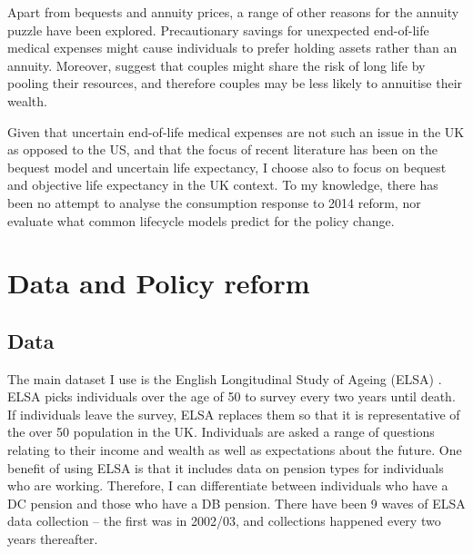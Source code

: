 \documentclass[12pt]{article}
\begin{document}
Apart from bequests and annuity prices, a range of other reasons for the annuity
puzzle have been explored. Precautionary savings for unexpected end-of-life
medical expenses might cause individuals to prefer holding assets rather than
an annuity. Moreover, \cite{vidalmelia_lejarragagarcia_munich_2004} suggest
that couples might share the risk of long life by pooling their resources, and
therefore couples may be less likely to annuitise their wealth.

Given that uncertain end-of-life medical expenses are not such an issue in the
UK as opposed to the US, and that the focus of recent literature has been on the
bequest model and uncertain life expectancy, I choose also to focus on bequest
and objective life expectancy in the UK context. To my knowledge, there has been
no attempt to analyse the consumption response to 2014 reform, nor evaluate what
common lifecycle models predict for the policy change.

\section{Data and Policy reform}

\subsection{Data}

The main dataset I use is the English Longitudinal Study of Ageing (ELSA)
\citep{main_elsa_citation}. ELSA picks individuals over the age of 50 to survey
every two years until death. If individuals leave the survey, ELSA replaces them
so that it is representative of the over 50 population in the UK. Individuals
are asked a range of questions relating to their income and wealth as well as
expectations about the future. One benefit of using ELSA is that it includes
data on pension types for individuals who are working. Therefore, I can
differentiate between individuals who have a DC pension and those who have a DB
pension. There have been 9 waves of ELSA data collection -- the first was in
2002/03, and collections happened every two years thereafter.
\end{document}
